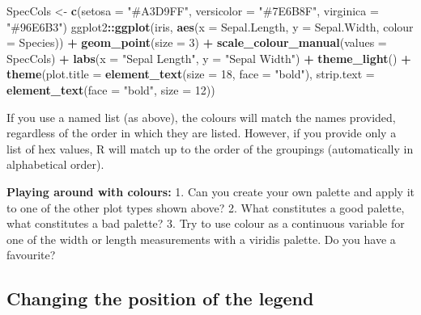 \documentclass[
]{book}
\newenvironment{Shaded}{\begin{snugshade}}{\end{snugshade}}
\newcommand{\AttributeTok}[1]{\textcolor[rgb]{0.13,0.29,0.53}{#1}}
\newcommand{\DecValTok}[1]{\textcolor[rgb]{0.00,0.00,0.81}{#1}}
\newcommand{\FunctionTok}[1]{\textcolor[rgb]{0.13,0.29,0.53}{\textbf{#1}}}
\newcommand{\NormalTok}[1]{#1}
\newcommand{\OtherTok}[1]{\textcolor[rgb]{0.56,0.35,0.01}{#1}}
\newcommand{\SpecialCharTok}[1]{\textcolor[rgb]{0.81,0.36,0.00}{\textbf{#1}}}
\newcommand{\StringTok}[1]{\textcolor[rgb]{0.31,0.60,0.02}{#1}}
\begin{document}
\begin{Shaded}
\begin{Highlighting}[]
\NormalTok{SpecCols }\OtherTok{\textless{}{-}} \FunctionTok{c}\NormalTok{(}\AttributeTok{setosa =} \StringTok{"\#A3D9FF"}\NormalTok{, }\AttributeTok{versicolor =} \StringTok{"\#7E6B8F"}\NormalTok{, }\AttributeTok{virginica =} \StringTok{"\#96E6B3"}\NormalTok{)}
\NormalTok{ggplot2}\SpecialCharTok{::}\FunctionTok{ggplot}\NormalTok{(iris, }\FunctionTok{aes}\NormalTok{(}\AttributeTok{x =}\NormalTok{ Sepal.Length, }\AttributeTok{y =}\NormalTok{ Sepal.Width, }\AttributeTok{colour =}\NormalTok{ Species)) }\SpecialCharTok{+}
  \FunctionTok{geom\_point}\NormalTok{(}\AttributeTok{size  =} \DecValTok{3}\NormalTok{) }\SpecialCharTok{+}
  \FunctionTok{scale\_colour\_manual}\NormalTok{(}\AttributeTok{values =}\NormalTok{ SpecCols) }\SpecialCharTok{+}  
  \FunctionTok{labs}\NormalTok{(}\AttributeTok{x =} \StringTok{"Sepal Length"}\NormalTok{, }\AttributeTok{y =} \StringTok{"Sepal Width"}\NormalTok{)  }\SpecialCharTok{+}
  \FunctionTok{theme\_light}\NormalTok{() }\SpecialCharTok{+}
  \FunctionTok{theme}\NormalTok{(}\AttributeTok{plot.title =} \FunctionTok{element\_text}\NormalTok{(}\AttributeTok{size =} \DecValTok{18}\NormalTok{, }\AttributeTok{face =} \StringTok{"bold"}\NormalTok{),}
        \AttributeTok{strip.text =} \FunctionTok{element\_text}\NormalTok{(}\AttributeTok{face =} \StringTok{"bold"}\NormalTok{, }\AttributeTok{size =} \DecValTok{12}\NormalTok{))}
\end{Highlighting}
\end{Shaded}

If you use a named list (as above), the colours will match the names provided, regardless of the order in which they are listed. However, if you provide only a list of hex values, R will match up to the order of the groupings (automatically in alphabetical order).

\textbf{Playing around with colours:}
1. Can you create your own palette and apply it to one of the other plot types shown above?
2. What constitutes a good palette, what constitutes a bad palette?
3. Try to use colour as a continuous variable for one of the width or length measurements with a viridis palette. Do you have a favourite?

\subsection{Changing the position of the legend}\label{changing-the-position-of-the-legend}
\end{document}
